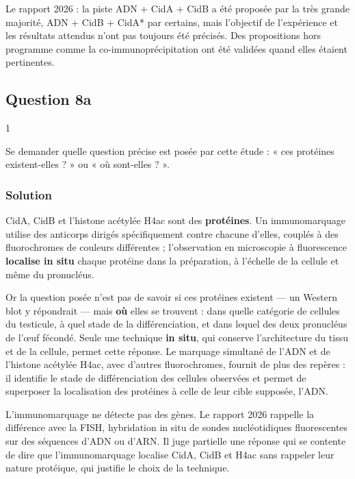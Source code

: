 \documentclass[11pt,a4paper]{article}
\begin{document}
\begin{jury}

Le rapport 2026 : la piste ADN + CidA + CidB a été proposée par la très grande majorité, ADN + CidB + CidA* par certains, mais l'objectif de l'expérience et les résultats attendus n'ont pas toujours été précisés. Des propositions hors programme comme la co-immunoprécipitation ont été validées quand elles étaient pertinentes.

\end{jury}

\hypertarget{question-8a}{%
\subsection{Question 8a}\label{question-8a}}

\begin{indication}{1}

Se demander quelle question précise est posée par cette étude : « ces protéines existent-elles ? » ou « où sont-elles ? ».

\end{indication}

\hypertarget{solution-57}{%
\subsubsection{Solution}\label{solution-57}}

CidA, CidB et l'histone acétylée H4ac sont des \textbf{protéines}. Un immunomarquage utilise des anticorps dirigés spécifiquement contre chacune d'elles, couplés à des fluorochromes de couleurs différentes ; l'observation en microscopie à fluorescence \textbf{localise in situ} chaque protéine dans la préparation, à l'échelle de la cellule et même du pronucléus.

Or la question posée n'est pas de savoir si ces protéines existent --- un Western blot y répondrait --- mais \textbf{où} elles se trouvent : dans quelle catégorie de cellules du testicule, à quel stade de la différenciation, et dans lequel des deux pronucléus de l'œuf fécondé. Seule une technique \textbf{in situ}, qui conserve l'architecture du tissu et de la cellule, permet cette réponse. Le marquage simultané de l'ADN et de l'histone acétylée H4ac, avec d'autres fluorochromes, fournit de plus des repères : il identifie le stade de différenciation des cellules observées et permet de superposer la localisation des protéines à celle de leur cible supposée, l'ADN.

\begin{piege}

L'immunomarquage ne détecte pas des gènes. Le rapport 2026 rappelle la différence avec la FISH, hybridation in situ de sondes nucléotidiques fluorescentes sur des séquences d'ADN ou d'ARN. Il juge partielle une réponse qui se contente de dire que l'immunomarquage localise CidA, CidB et H4ac sans rappeler leur nature protéique, qui justifie le choix de la technique.

\end{piege}
\end{document}
